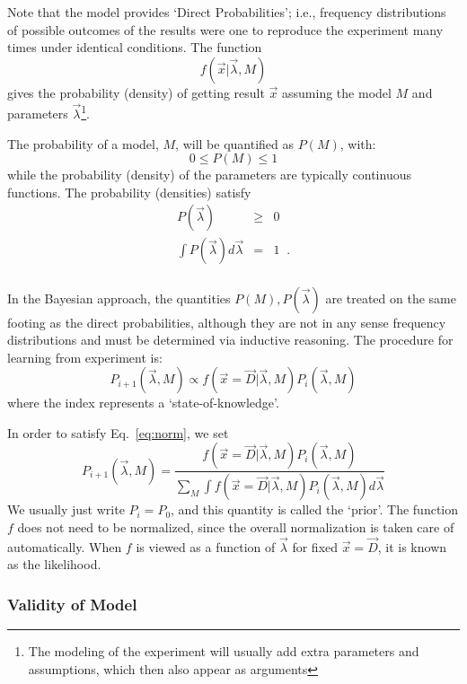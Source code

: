 \documentclass[11pt, a4paper]{article}
\begin{document}
Note that the model provides `Direct Probabilities'; i.e., frequency
distributions of possible outcomes of the results were one to
reproduce the experiment many times under identical conditions.  The
function
%
\begin{equation}
f(\vec{x}|\vec{\lambda},M)
\end{equation}
%
gives the probability (density) of getting result $\vec{x}$ assuming
the model $M$ and parameters $\vec{\lambda}$\footnote{The modeling of
the experiment will usually add extra parameters and assumptions,
which then also appear as arguments}.

The probability of a model, $M$, will be quantified as $P(M)$, with:
%
\begin{equation}
\label{eq:norm}
0 \leq P(M) \leq 1
\end{equation}
%
while the probability (density) of the parameters are typically
continuous functions.  The probability (densities) satisfy
%
\begin{eqnarray*}
P(\vec{\lambda}) & \ge & 0 \\
\int P(\vec{\lambda}) d\vec{\lambda} &=&1 \;\; .\\
\end{eqnarray*}

In the Bayesian approach, the quantities $P(M), P(\vec{\lambda})$ are
treated on the same footing as the direct probabilities, although they
are not in any sense frequency distributions and must be determined
via inductive reasoning.  The procedure for learning from experiment
is:
%
\begin{equation}
P_{i+1}(\vec{\lambda},M) \propto f(\vec{x}=\vec{D}|\vec{\lambda},M) P_{i}(\vec{\lambda},M) 
\end{equation}
%
where the index represents a `state-of-knowledge'.  

In order to satisfy Eq.~\ref{eq:norm}, we set
%
\begin{equation}
P_{i+1}(\vec{\lambda},M) =\frac{f(\vec{x}=\vec{D}|\vec{\lambda},M) P_{i}(\vec{\lambda},M)}
{\sum_M \int f(\vec{x}=\vec{D}|\vec{\lambda},M) P_{i}(\vec{\lambda},M) d{\vec{\lambda}}}
\end{equation}
%
We usually just write $P_i=P_0$, and this quantity is called the
`prior'.  The function $f$ does not need to be normalized, since the
overall normalization is taken care of automatically.  When $f$ is
viewed as a function of $\vec{\lambda}$ for fixed $\vec{x}=\vec{D}$,
it is known as the likelihood.

\subsubsection{Validity of Model}
\label{subsection:validity}
\end{document}
